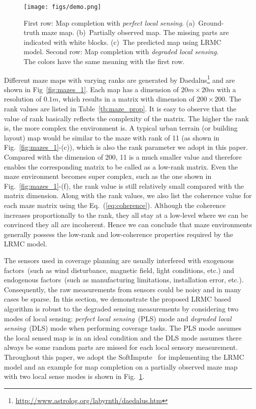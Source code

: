 \begin{figure}[t] \vspace{-3pt}
  \centering
  	{\label{fig:demo}\texttt{[image: figs/demo.png]}}
  \caption{\small First row: Map completion with \textit{perfect local sensing}. (a)~Ground-truth maze map. (b)~Partially observed map. The missing parts are indicated with white blocks. (c)~The predicted map using LRMC model. Second row: Map completion with \textit{degraded local sensing}. The colors have the same meaning with the first row.
  } \vspace{-10pt}
\label{fig:demo}  
\end{figure}

Different maze maps with varying ranks are generated by Daedalus\footnote{\url{http://www.astrolog.org/labyrnth/daedalus.htm}} and are shown in Fig~\ref{fig:mazes_1}. Each map has a dimension of $20m \times 20m$ with a resolution of $0.1m$, which results in a matrix with dimension of $200\times 200$. The rank values are listed in Table~\ref{tb:maze_prop}. It is easy to observe that the value of rank basically reflects the complexity of the matrix. The higher the rank is, the more complex the environment is. A typical urban terrain (or building layout) map would be similar to the maze with rank of 11 (as shown in Fig.~\ref{fig:mazes_1}-(c)), which is also the rank parameter we adopt in this paper. Compared with the dimension of 200, 11 is a much smaller value and therefore enables the corresponding matrix to be called as a low-rank matrix. Even the maze environment becomes super complex, such as the one shown in Fig.~\ref{fig:mazes_1}-(f), the rank value is still relatively small compared with the matrix dimension. Along with the rank values, we also list the coherence value for each maze matrix using the Eq.~(\ref{eq:coherence}). Although the coherence increases proportionally to the rank, they all stay at a low-level where we can be convinced they all are incoherent. Hence we can conclude that maze environments generally possess the low-rank and low-coherence properties required by the LRMC model. 

The sensors used in coverage planning are usually interfered with exogenous factors~(such as wind disturbance, magnetic field, light conditions, etc.) and endogenous factors~(such as manufacturing limitations, installation error, etc.). Consequently, the raw measurements from sensors could be noisy and in many cases be sparse. In this section, we demonstrate the proposed LRMC based algorithm is robust to the degraded sensing measurements by considering two modes of local sensing: \textit{perfect local sensing}~(PLS) mode and \textit{degraded local sensing}~(DLS) mode when performing coverage tasks. The PLS mode assumes the local sensed map is in an ideal condition and the DLS mode assumes there always be some random parts are missed for each local sensory measurement. Throughout this paper, we adopt the  SoftImpute~\cite{mazumder2010spectral} for implementing the LRMC model and an example for map completion on a partially observed maze map with two local sense modes is shown in Fig.~\ref{fig:demo}. 


